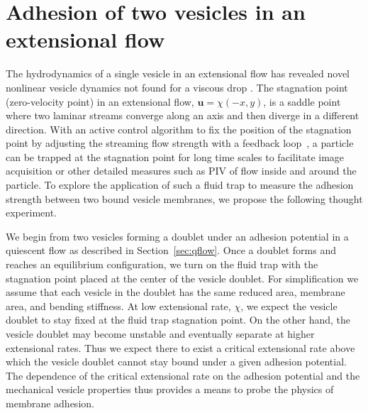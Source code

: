 \documentclass[prf,superscriptaddress,showpacs]{revtex4-1}
\newcommand{\uu}{\mathbf{u}}
\begin{document}
\section{Adhesion of two vesicles in an extensional flow} 
\label{sec:eflow} 
The hydrodynamics of a single vesicle in an extensional flow has
revealed novel nonlinear vesicle dynamics not found for a viscous drop
\cite{KantslerSegreSteinberg2008_PRL, ZhaoShaqfeh2013_JFM,
Narsimhan2014_JFM, DahlNarsimhanGouveia2016_SoftMatt}.  The stagnation
point (zero-velocity point) in an extensional flow, $\uu =\chi(-x,y)$,
is a saddle point where two laminar streams converge along an axis and
then diverge in a different direction.  With an active control algorithm
to fix the position of the stagnation point by adjusting the streaming
flow strength with a feedback loop~\cite{Johnson-Chavarria2011_EMJ}, a
particle can be trapped at the stagnation point for long time scales to
facilitate image acquisition or other detailed measures such as PIV of
flow inside and around the particle.  To explore the application of such
a fluid trap to measure the adhesion strength between two bound vesicle
membranes, we propose the following thought experiment.

We begin from two vesicles forming a doublet under an adhesion potential
in a quiescent flow as described in Section~\ref{sec:qflow}.  Once a
doublet forms and reaches an equilibrium configuration, we turn on the
fluid trap with the stagnation point placed at the center of the vesicle
doublet.  For simplification we assume that each vesicle in the doublet
has the same reduced area, membrane area, and bending stiffness.  At low
extensional rate, $\chi$, we expect the vesicle doublet to stay fixed at
the fluid trap stagnation point.  On the other hand, the vesicle doublet
may become unstable and eventually separate at higher extensional rates.
Thus we expect there to exist a critical extensional rate above which
the vesicle doublet cannot stay bound under a given adhesion potential.
The dependence of the critical extensional rate on the adhesion
potential and the mechanical vesicle properties thus provides a means to
probe the physics of membrane adhesion.
\end{document}
